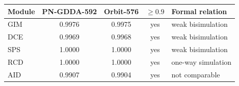 \begin{tabular}{lcccl}
\toprule
Module & PN-GDDA-592 & Orbit-576 & $\geq0.9$ & Formal relation \\
\midrule
GIM & 0.9976 & 0.9975 & yes & weak bisimulation \\
DCE & 0.9969 & 0.9968 & yes & weak bisimulation \\
SPS & 1.0000 & 1.0000 & yes & weak bisimulation \\
RCD & 1.0000 & 1.0000 & yes & one-way simulation \\
AID & 0.9907 & 0.9904 & yes & not comparable \\
\bottomrule
\end{tabular}
